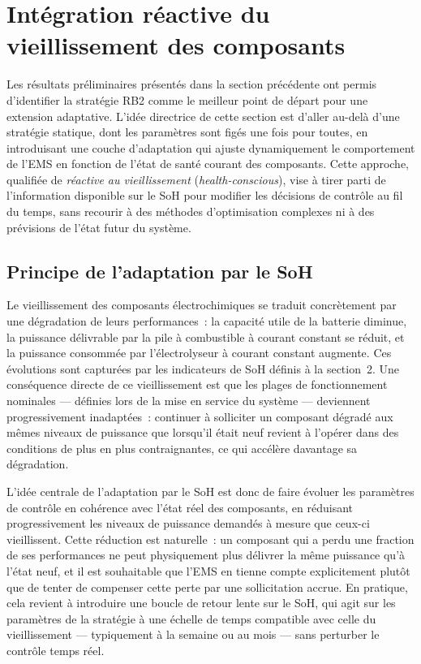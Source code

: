 
\section{Intégration réactive du vieillissement des composants}

Les résultats préliminaires présentés dans la section précédente ont permis d'identifier la stratégie RB2 comme le meilleur point de départ pour une extension adaptative. L'idée directrice de cette section est d'aller au-delà d'une stratégie statique, dont les paramètres sont figés une fois pour toutes, en introduisant une couche d'adaptation qui ajuste dynamiquement le comportement de l'EMS en fonction de l'état de santé courant des composants. Cette approche, qualifiée de \textit{réactive au vieillissement} (\textit{health-conscious}), vise à tirer parti de l'information disponible sur le SoH pour modifier les décisions de contrôle au fil du temps, sans recourir à des méthodes d'optimisation complexes ni à des prévisions de l'état futur du système.

\subsection{Principe de l'adaptation par le SoH}

Le vieillissement des composants électrochimiques se traduit concrètement par une dégradation de leurs performances~: la capacité utile de la batterie diminue, la puissance délivrable par la pile à combustible à courant constant se réduit, et la puissance consommée par l'électrolyseur à courant constant augmente. Ces évolutions sont capturées par les indicateurs de SoH définis à la section~2. Une conséquence directe de ce vieillissement est que les plages de fonctionnement nominales — définies lors de la mise en service du système — deviennent progressivement inadaptées~: continuer à solliciter un composant dégradé aux mêmes niveaux de puissance que lorsqu'il était neuf revient à l'opérer dans des conditions de plus en plus contraignantes, ce qui accélère davantage sa dégradation.

L'idée centrale de l'adaptation par le SoH est donc de faire évoluer les paramètres de contrôle en cohérence avec l'état réel des composants, en réduisant progressivement les niveaux de puissance demandés à mesure que ceux-ci vieillissent. Cette réduction est naturelle~: un composant qui a perdu une fraction de ses performances ne peut physiquement plus délivrer la même puissance qu'à l'état neuf, et il est souhaitable que l'EMS en tienne compte explicitement plutôt que de tenter de compenser cette perte par une sollicitation accrue. En pratique, cela revient à introduire une boucle de retour lente sur le SoH, qui agit sur les paramètres de la stratégie à une échelle de temps compatible avec celle du vieillissement — typiquement à la semaine ou au mois — sans perturber le contrôle temps réel.

